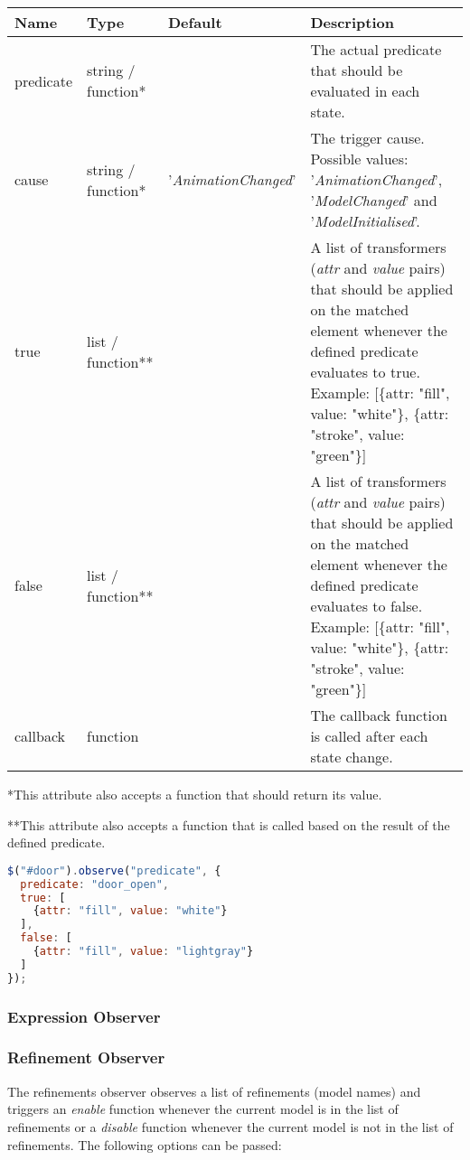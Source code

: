 \begin{tabular}{ l l l p{7cm} }
  \textbf{Name} & \textbf{Type} & \textbf{Default} & \textbf{Description} \\
  \hline\noalign{\medskip}
  predicate & string / function* & & The actual predicate that should be evaluated in each state.\\
  \hline\noalign{\medskip}
  cause & string / function* & '\textit{AnimationChanged}' & The trigger cause. Possible values: '\textit{AnimationChanged}', '\textit{ModelChanged}' and '\textit{ModelInitialised}'. \\
  \hline\noalign{\medskip}
  true & list / function** & & A list of transformers (\textit{attr} and \textit{value} pairs) that should be applied on the matched element whenever the defined predicate evaluates to true. Example: 
  [\{attr: "fill", value: "white"\}, \{attr: "stroke", value: "green"\}]\\
  \hline\noalign{\medskip}
  false & list / function** & & A list of transformers (\textit{attr} and \textit{value} pairs) that should be applied on the matched element whenever the defined predicate evaluates to false. Example: 
  [\{attr: "fill", value: "white"\}, \{attr: "stroke", value: "green"\}]\\
  \hline\noalign{\medskip}
  callback & function &  & The callback function is called after each state change.
\end{tabular}

*This attribute also accepts a function that should return its value.

**This attribute also accepts a function that is called based on the result of the defined predicate.

\begin{lstlisting}[float=ht,language=JavaScript]
$("#door").observe("predicate", {
  predicate: "door_open",
  true: [
    {attr: "fill", value: "white"}
  ],
  false: [
    {attr: "fill", value: "lightgray"}
  ]
});
\end{lstlisting}

\subsubsection{Expression Observer}

\subsubsection{Refinement Observer}

The refinements observer observes a list of refinements (model names) and triggers an \textit{enable} function whenever the current model is in the list of refinements or a \textit{disable} function whenever the current model is not in the list of refinements.
The following options can be passed:


